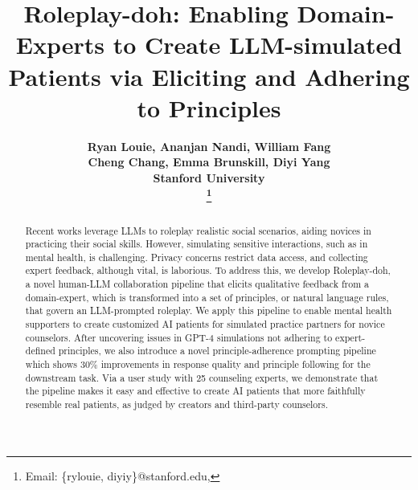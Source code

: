 \documentclass[11pt]{article}
\title{Roleplay-doh: Enabling Domain-Experts to Create LLM-simulated\\ Patients via Eliciting and Adhering to Principles}
\author{\bf \hypersetup{linkcolor=black}
Ryan Louie, Ananjan Nandi, William Fang \\
\bf \hypersetup{linkcolor=black}
Cheng Chang, Emma Brunskill, Diyi Yang \\
Stanford University\\ 
\thanks{Email: \{rylouie, diyiy\}@stanford.edu, }
        }
\begin{document}
\maketitle
\begin{abstract}
Recent works leverage LLMs to roleplay realistic social scenarios, aiding novices in practicing their social skills. However, simulating sensitive interactions, such as in mental health, is challenging. Privacy concerns restrict data access, and collecting expert feedback, although vital, is laborious.
To address this, we develop Roleplay-doh, a novel human-LLM collaboration pipeline that elicits qualitative feedback from a domain-expert, which is transformed into a set of principles, or natural language rules, that govern an LLM-prompted roleplay. 
We apply this pipeline to enable mental health supporters to create customized AI patients for simulated practice partners for novice counselors. After uncovering issues in GPT-4 simulations not adhering to expert-defined principles, we also introduce a novel principle-adherence prompting pipeline which shows 30\% improvements in response quality and principle following for the downstream task.  Via a user study with 25 counseling experts, we demonstrate that the pipeline makes it easy and effective to create AI patients that more faithfully resemble real patients, as judged by creators and third-party counselors.


\end{abstract}
\end{document}
